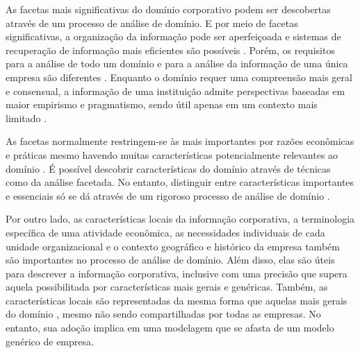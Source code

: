 
As facetas mais significativas do domínio corporativo podem ser descobertas através de um processo de análise de domínio. E por meio de facetas significativas, a organização da informação pode ser aperfeiçoada e sistemas de recuperação de informação mais eficientes são possíveis \cite{albrechtsen1993subject}. Porém, os requisitos para a análise de todo um domínio e para a análise da informação de uma única empresa são diferentes \cite{gopinath92}. Enquanto o domínio requer uma compreensão mais geral e consensual, a informação de uma instituição admite perspectivas baseadas em maior empirismo e pragmatismo, sendo útil apenas em um contexto mais limitado \cite{hjorland2002domain}.

As facetas normalmente restringem-se às mais importantes por razões econômicas e práticas mesmo havendo muitas características potencialmente relevantes ao domínio \cite{ranganathan1967}. É possível descobrir características do domínio através de técnicas como da análise facetada. No entanto, distinguir entre características importantes e essenciais só se dá através de um rigoroso processo de análise de domínio \cite{lykke2011domain}.

Por outro lado, as características locais da informação corporativa, a terminologia específica de uma atividade econômica, as necessidades individuais de cada unidade organizacional e o contexto geográfico e histórico da empresa também são importantes no processo de análise de domínio. Além disso, elas são úteis para descrever a informação corporativa, inclusive com uma precisão que supera aquela possibilitada por características mais gerais e genéricas. Também, as características locais são representadas da mesma forma que aquelas mais gerais do domínio \cite{dolby09extractingVocabularies,giess2008generation,wild2009describing}, mesmo não sendo compartilhadas por todas as empresas. No entanto, sua adoção implica em uma modelagem que se afasta de um modelo genérico de empresa.

